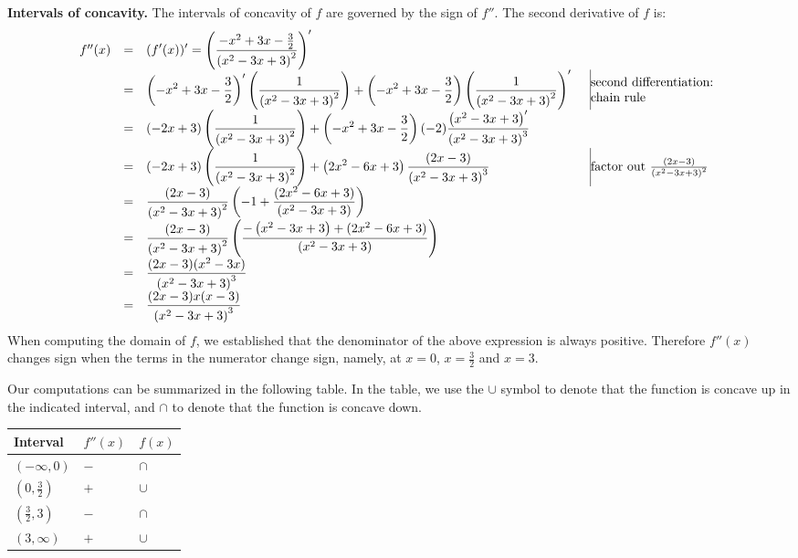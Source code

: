 {\textbf{Intervals of concavity. } 
The intervals of concavity of $f$ are governed by the sign of $f''$. The second derivative of $f$ is:
\[
\begin{array}{rcll|@{}l}
f''(x)&=&\displaystyle (f'(x))'= \left( \frac{- x^{2}+3 x-\frac{3}{2} }{ \left(x^2- 3 x+3\right)^2 } \right)'\\
&=&\displaystyle \left(- x^{2}+3 x-\frac{3}{2} \right)' \left(\frac{1 }{\left(x^2- 3 x+3\right)^2}\right)+ \left(- x^{2}+3 x-\frac{3}{2} \right)\left(\frac{1}{\left(x^2- 3 x+3\right)^2}\right)' &&\begin{array}{@{}l}\text{second differentiation:}\\\text{chain rule }\end{array}\\
&=&\displaystyle (-2x+3)\left(\frac{1}{\left(x^2- 3 x+3\right)^2} \right)+\left(- x^{2}+3 x-\frac{3}{2} \right)(-2)\frac{\left(x^2- 3 x+3\right)'}{\left(x^2- 3 x+3\right)^{3}}\\
&=&\displaystyle (-2x+3)\left(\frac{1}{\left(x^2- 3 x+3\right)^2}\right) +\left(2x^{2}-6 x+3 \right) \frac{(2x-3)}{\left(x^2- 3 x+3\right)^{3}}&&\text{factor out }\frac{(2x-3)}{\left(x^2- 3 x+3\right)^2}\\
&=&\displaystyle \frac{(2x-3)}{\left(x^2- 3 x+3\right)^2}\left(-1+\frac{(2x^{2}-6 x+3)}{\left(x^2- 3 x+3\right)}\right)\\
&=&\displaystyle \frac{(2x-3)}{\left(x^2- 3 x+3\right)^2}\left(\frac{-\left(x^2- 3 x+3\right)+(2x^{2}-6 x+3)}{\left(x^2- 3 x+3\right)} \right)\\
&=&\displaystyle \frac{(2x-3)(x^{2}-3 x )}{\left(x^2- 3 x+3\right)^3}\\
&=&\displaystyle \frac{(2x-3)x(x-3)}{\left(x^2- 3 x+3\right)^3}
\end{array}
\]
When computing the domain of $f$, we established that the denominator of the above expression is always positive. Therefore $f''(x)$ changes sign when the terms in the numerator change sign, namely, at $x=0$, $x=\frac{3}{2}$ and $x=3$. 

Our computations can be summarized in the following table. In the table, we use the $\cup$ symbol to denote that the function is concave up in the indicated interval, and $\cap$ to denote that the function is concave down.

\begin{tabular}{|lll|}\hline
Interval & $f''(x)$ & $f(x)$   \\\hline
$(-\infty, 0)$ & $-$& $\cap$ \\\hline
$(0, \frac{3}{2})$ &$+$&$\cup$\\\hline
$(\frac{3}{2}, 3)$&$-$&$\cap$ \\\hline
$(3, \infty)$&$+$&$\cup$ \\\hline
\end{tabular}

}
